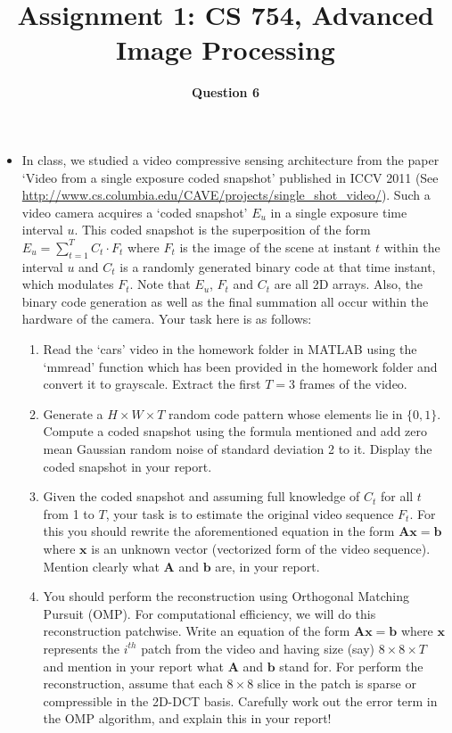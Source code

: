 \documentclass[12pt]{article}
\title{Assignment 1: CS 754, Advanced Image Processing}
\author{\textbf{Question 6}}
\date{}
\begin{document}
\maketitle

\begin{itemize}
    \item In class, we studied a video compressive sensing architecture from the paper `Video from a single exposure coded snapshot' published in ICCV 2011 (See \url{http://www.cs.columbia.edu/CAVE/projects/single_shot_video/}). Such a video camera acquires a `coded snapshot' $E_u$ in a single exposure time interval $u$. This coded snapshot is the superposition of the form $E_u = \sum_{t=1}^T C_t \cdot F_t$ where $F_t$ is the image of the scene at instant $t$ within the interval $u$ and $C_t$ is a randomly generated binary code at that time instant, which modulates $F_t$. Note that $E_u$, $F_t$ and $C_t$ are all 2D arrays. Also, the binary code generation as well as the final summation all occur within the hardware of the camera. Your task here is as follows:
\begin{enumerate}
\item Read the `cars' video in the homework folder in MATLAB using the `mmread' function which has been provided in the homework folder and convert it to grayscale. Extract the first $T = 3$ frames of the video.
\item Generate a $H \times W \times T$ random code pattern whose elements lie in $\{0,1\}$. Compute a coded snapshot using the formula mentioned and add zero mean Gaussian random noise of standard deviation 2 to it. Display the coded snapshot in your report.
\item Given the coded snapshot and assuming full knowledge of $C_t$ for all $t$ from 1 to $T$, your task is to estimate the original video sequence $F_t$. For this you should rewrite the aforementioned equation in the form $\boldsymbol{Ax} = \boldsymbol{b}$ where $\boldsymbol{x}$ is an unknown vector (vectorized form of the video sequence). Mention clearly what $\boldsymbol{A}$ and $\boldsymbol{b}$ are, in your report.
\item You should perform the reconstruction using Orthogonal Matching Pursuit (OMP). For computational efficiency, we will do this reconstruction patchwise. Write an equation of the form $\boldsymbol{Ax} = \boldsymbol{b}$ where $\boldsymbol{x}$ represents the $i^{th}$ patch from the video and having size (say) $8 \times 8 \times T$ and mention in your report what $\boldsymbol{A}$ and $\boldsymbol{b}$ stand for. For perform the reconstruction, assume that each $8 \times 8$ slice in the patch is sparse or compressible in the 2D-DCT basis. Carefully work out the error term in the OMP algorithm, and explain this in your report!

\end{enumerate}
\end{itemize}
\end{document}
